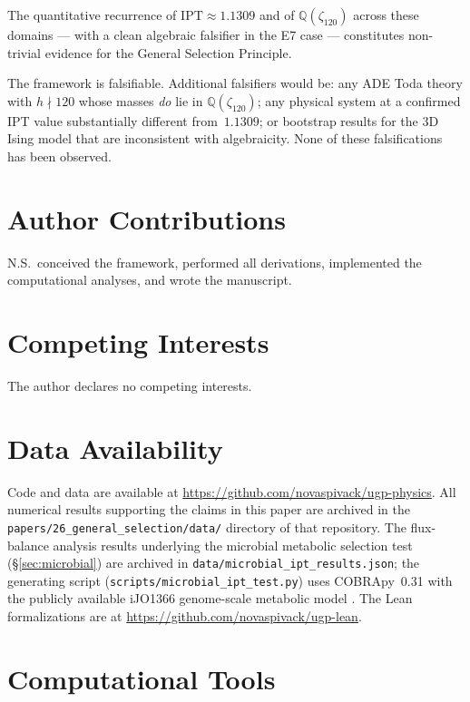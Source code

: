 \documentclass[11pt]{article}
\theoremstyle{remark}
\newcommand{\IPT}{\mathrm{IPT}}
\newcommand{\zetaN}[1]{\zeta_{#1}}
\begin{document}
The quantitative recurrence of $\IPT \approx 1.1309$ and of $\mathbb{Q}(\zetaN{120})$
across these domains --- with a clean algebraic falsifier in the E7 case ---
constitutes non-trivial evidence for the General Selection Principle.

The framework is falsifiable.
Additional falsifiers would be: any ADE Toda theory with $h\nmid 120$ whose masses
\emph{do} lie in $\mathbb{Q}(\zetaN{120})$; any physical system at a confirmed
IPT value substantially different from~$1.1309$; or bootstrap results for the 3D Ising
model that are inconsistent with algebraicity.
None of these falsifications has been observed.


\section*{Author Contributions}

N.S.\ conceived the framework, performed all derivations, implemented the
computational analyses, and wrote the manuscript.

\section*{Competing Interests}

The author declares no competing interests.

\section*{Data Availability}

Code and data are available at \url{https://github.com/novaspivack/ugp-physics}.
All numerical results supporting the claims in this paper are archived in the
\texttt{papers/26\_general\_selection/data/} directory of that repository.
The flux-balance analysis results underlying the microbial metabolic selection
test (§\ref{sec:microbial}) are archived in
\texttt{data/microbial\_ipt\_results.json}; the generating script
(\texttt{scripts/microbial\_ipt\_test.py}) uses COBRApy~0.31 with the
publicly available iJO1366 genome-scale metabolic model
\cite{OrthiJO1366_2011}.
The Lean formalizations are at \url{https://github.com/novaspivack/ugp-lean}.

\section*{Computational Tools}
\end{document}
